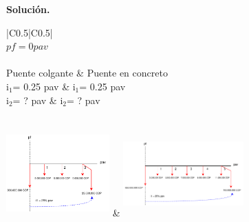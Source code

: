\textbf{Solución.}\\
\begin{center}
	\renewcommand{\arraystretch}{1.5}%
	\begin{longtable}[H]{|C{0.5\linewidth}|C{0.5\linewidth}|}
		\hline
		   \\ \hline
		 {$pf = 0 pav$} \\ \hline
		   \\ \hline
		Puente colgante & Puente en concreto \\ 
		i$_{1}$= 0.25 pav & i$_{1}$= 0.25 pav\\
		i$_{2}$= ? pav & i$_{2}$= ? pav\\ \hline

  
		 \\ \hline
		\includegraphics[trim=-5 -5 -5 -5 , scale=1,width=150px, height=125px]{9_Capitulo/ejemplos/6/Capitulo9Ejercicio6a.pdf} &  
		\includegraphics[trim=-5 -5 -5 -5 , scale=1,width=175px, height=125px]{9_Capitulo/ejemplos/6/Capitulo9Ejercicio6b.pdf}  \\ \hline




\end{longtable}
\end{center}
